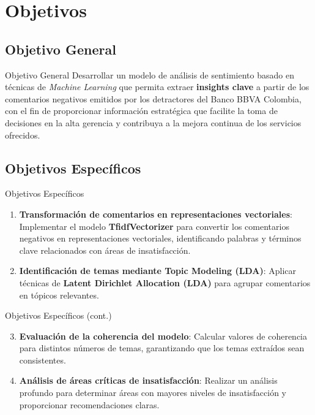 \documentclass[aspectratio=169, xcolor={dvipsnames}, 10pt, spanish]{beamer}
\begin{document}
\section{Objetivos}
\subsection{Objetivo General}
\begin{frame}{Objetivo General}
    Desarrollar un modelo de análisis de sentimiento basado en técnicas de \textit{Machine Learning} que permita extraer \textbf{insights clave} a partir de los comentarios negativos emitidos por los detractores del Banco BBVA Colombia, con el fin de proporcionar información estratégica que facilite la toma de decisiones en la alta gerencia y contribuya a la mejora continua de los servicios ofrecidos.
\end{frame}

\subsection{Objetivos Específicos}
\begin{frame}{Objetivos Específicos}
    \begin{enumerate}
        \item \textbf{Transformación de comentarios en representaciones vectoriales}: Implementar el modelo \textbf{TfidfVectorizer} para convertir los comentarios negativos en representaciones vectoriales, identificando palabras y términos clave relacionados con áreas de insatisfacción.
        \item \textbf{Identificación de temas mediante Topic Modeling (LDA)}: Aplicar técnicas de \textbf{Latent Dirichlet Allocation (LDA)} para agrupar comentarios en tópicos relevantes.
    \end{enumerate}
\end{frame}

\begin{frame}{Objetivos Específicos (cont.)}
    \begin{enumerate}
        \setcounter{enumi}{2}
        \item \textbf{Evaluación de la coherencia del modelo}: Calcular valores de coherencia para distintos números de temas, garantizando que los temas extraídos sean consistentes.
        \item \textbf{Análisis de áreas críticas de insatisfacción}: Realizar un análisis profundo para determinar áreas con mayores niveles de insatisfacción y proporcionar recomendaciones claras.
    \end{enumerate}
\end{frame}
\end{document}
